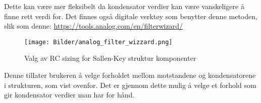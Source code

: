 Dette kan være mer fleksibelt da kondensator verdier kan være vanskeligere å finne rett verdi for. Det finnes også digitale 
verktøy som benytter denne metoden, slik som denne: \url{https://tools.analog.com/en/filterwizard/}
\begin{figure}[H]
    \centering
    \texttt{[image: Bilder/analog\_filter\_wizzard.png]}
    \caption{Valg av RC sizing for Sallen-Key struktur komponenter}
    \label{analog-wizzard}
\end{figure}
Denne tillater brukeren å velge forholdet mellom motstandene og kondensatorene i strukturen, som vist ovenfor. Det er gjennom 
dette mulig å velge et forhold som gir kondensator verdier man har for hånd.

